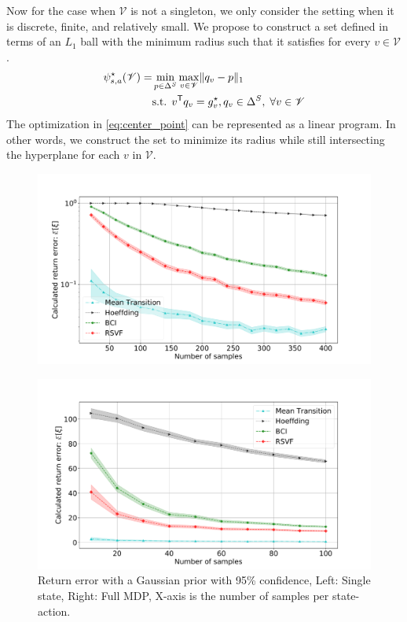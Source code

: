 \documentclass{article}
\DeclarePairedDelimiter{\norm}{\lVert}{\rVert}
\newcommand{\opt}{^\star}
\newcommand{\tr}{^{\mathsf{T}}}
\newcommand{\vset}{\mathcal{V}}
\theoremstyle{plain}
\theoremstyle{definition}
\begin{document}
Now for the case when $\mathcal{V}$ is not a singleton, we only consider the setting when it is discrete, finite, and relatively small. We propose to construct a set defined in terms of an $L_1$ ball with the minimum radius such that it satisfies for every $v\in\mathcal{V}$.
\begin{equation} \label{eq:center_point}
\begin{split}
\psi_{s,a}\opt(\mathcal{V}) = & \min_{p\in\Delta^S} \max_{v\in\vset} \norm{q_v - p}_1 \\
& \text{s.t. } v\tr  q_v = g_{v}\opt, q_v \in \Delta^S, \; \forall v \in\vset
\end{split}
\end{equation}
The optimization in \eqref{eq:center_point} can be represented as a linear program. In other words, we construct the set to minimize its radius while still intersecting the hyperplane for each $v$ in $\vset$.

\begin{figure}
	\centering
	\begin{minipage}[c]{.45\columnwidth}
		\centering
		\includegraphics[width=\linewidth]{fig/gaussian_return_single_state.pdf}\\
	\end{minipage}%
	\begin{minipage}[c]{.45\columnwidth}
		\centering
		\includegraphics[width=\linewidth]{fig/Glossy_Buckthorn_Under_Estimation.pdf}
	\end{minipage}%
	\caption{Return error with a Gaussian prior with 95\% confidence, Left: Single state, Right: Full MDP, X-axis is the number of samples per state-action.}
	\label{fig:return_single_multiple}
\end{figure}
\end{document}
